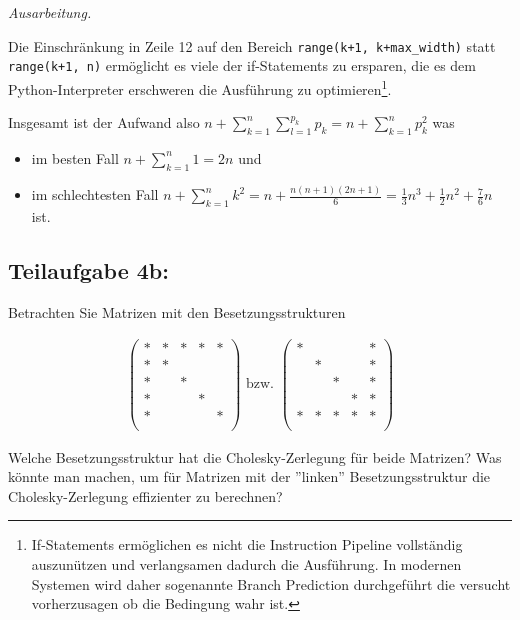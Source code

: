 \documentclass[]{article}
\newenvironment{ausarbeitung}{\vspace{3mm}\noindent\textit{Ausarbeitung.}}{}
\begin{document}
\begin{ausarbeitung}
\begin{itemize}
		Die Einschränkung in Zeile 12 auf den Bereich \texttt{range(k+1, k+max\_width)} statt \texttt{range(k+1, n)} ermöglicht es viele der if-Statements zu ersparen, die es dem Python-Interpreter erschweren die Ausführung zu optimieren\footnote{If-Statements ermöglichen es nicht die Instruction Pipeline vollständig auszunützen und verlangsamen dadurch die Ausführung. In modernen Systemen wird daher sogenannte Branch Prediction durchgeführt die versucht vorherzusagen ob die Bedingung wahr ist.}.
		
		Insgesamt ist der Aufwand also $n + \sum_{k=1}^{n} \sum_{l=1}^{p_k}p_k = n + \sum_{k=1}^{n} p_k^2$ was  
		\begin{itemize}
			\item im besten Fall $n + \sum_{k=1}^{n} 1 = 2n$ und
			\item im schlechtesten Fall $n + \sum_{k=1}^{n}k^2 = n + \frac{n(n+1)(2n+1)}{6} = \frac{1}{3}n^3 + \frac{1}{2}n^2 + \frac{7}{6}n$ ist.
		\end{itemize}
	\end{itemize}
	
\end{ausarbeitung}


\subsection*{Teilaufgabe 4b:}
Betrachten Sie Matrizen mit den Besetzungsstrukturen

\begin{align*}
	\begin{pmatrix}
		* & * & * & * & *\\
		* & * &   &   &  \\
		* &   & * &   &  \\
		* &   &   & * &  \\
		* &   &   &   & *\\
	\end{pmatrix}
	\text{ bzw. }
	\begin{pmatrix}
	* &   &   &   & *\\
	  & * &   &   & *\\
	  &   & * &   & *\\
	  &   &   & * & *\\
	* & * & * & * & *\\
\end{pmatrix}
\end{align*}

Welche Besetzungsstruktur hat die Cholesky-Zerlegung für beide Matrizen? Was könnte man machen, um für Matrizen mit der ''linken'' Besetzungsstruktur die Cholesky-Zerlegung effizienter zu berechnen?
\end{document}
